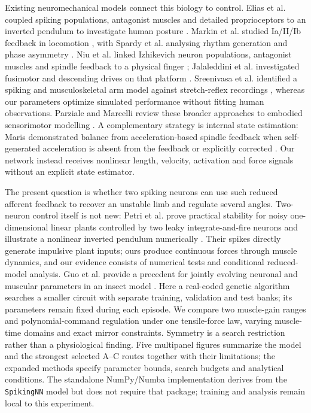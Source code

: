 \documentclass{styles/svproc}
\newcommand{\SpikingNN}{\texttt{SpikingNN}}
\begin{document}
Existing neuromechanical models connect this biology to control. Elias et al. coupled spiking populations, antagonist muscles and detailed proprioceptors to an inverted pendulum to investigate human posture \cite{elias2014}. Markin et al. studied Ia/II/Ib feedback in locomotion \cite{markin2010}, with Spardy et al. analysing rhythm generation and phase asymmetry \cite{spardy2011,spardy2011ii}. Niu et al. linked Izhikevich neuron populations, antagonist muscles and spindle feedback to a physical finger \cite{niu2017}; Jalaleddini et al. investigated fusimotor and descending drives on that platform \cite{jalaleddini2017}. Sreenivasa et al. identified a spiking and musculoskeletal arm model against stretch-reflex recordings \cite{sreenivasa2016}, whereas our parameters optimize simulated performance without fitting human observations. Parziale and Marcelli review these broader approaches to embodied sensorimotor modelling \cite{parziale2024}. A complementary strategy is internal state estimation: Maris demonstrated balance from acceleration-based spindle feedback when self-generated acceleration is absent from the feedback or explicitly corrected \cite{maris2025}. Our network instead receives nonlinear length, velocity, activation and force signals without an explicit state estimator.

The present question is whether two spiking neurons can use such reduced afferent feedback to recover an unstable limb and regulate several angles. Two-neuron control itself is not new: Petri et al. prove practical stability for noisy one-dimensional linear plants controlled by two leaky integrate-and-fire neurons and illustrate a nonlinear inverted pendulum numerically \cite{petri2026}. Their spikes directly generate impulsive plant inputs; ours produce continuous forces through muscle dynamics, and our evidence consists of numerical tests and conditional reduced-model analysis. Guo et al. provide a precedent for jointly evolving neuronal and muscular parameters in an insect model \cite{guo2018}. Here a real-coded genetic algorithm searches a smaller circuit with separate training, validation and test banks; its parameters remain fixed during each episode. We compare two muscle-gain ranges and polynomial-command regulation under one tensile-force law, varying muscle-time domains and exact mirror constraints. Symmetry is a search restriction rather than a physiological finding. Five multipanel figures summarize the model and the strongest selected A--C routes together with their limitations; the expanded methods specify parameter bounds, search budgets and analytical conditions. The standalone NumPy/Numba implementation derives from the \SpikingNN{} model but does not require that package; training and analysis remain local to this experiment.
\end{document}

